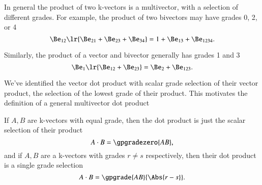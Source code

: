 %
%

In general the product of two k-vectors is a multivector, with a selection of different grades.
For example, the product of two bivectors may have grades 0, 2, or 4
\begin{dmath}\label{eqn:generalizedDot:601}
\Be_{12} \lr{ \Be_{21} + \Be_{23} + \Be_{34} }
=
1 + \Be_{13} + \Be_{1234}.
\end{dmath}

Similarly,
the product of a vector and bivector generally has grades 1 and 3
\begin{dmath}\label{eqn:generalizedDot:621}
\Be_1 \lr{ \Be_{12} + \Be_{23} }
=
\Be_2 + \Be_{123}.
\end{dmath}

We've identified the vector dot product with scalar grade selection of their vector product, the selection of the lowest grade of their product.
This motivates the definition of a general multivector dot product


If \( A, B \) are k-vectors with equal grade, then the dot product is just the scalar selection of their product
\begin{dmath}\label{eqn:generalizedDot:580}
A \cdot B = \gpgradezero{ A B },
\end{dmath}
and if \( A, B \) are a k-vectors with grades \( r \ne s \) respectively, then their dot product is a single grade selection
\begin{dmath}\label{eqn:generalizedDot:581}
A \cdot B = \gpgrade{ A B }{\Abs{r - s}}.
\end{dmath}

